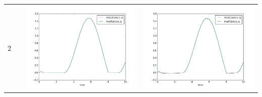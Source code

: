 \documentclass[10pt]{article}
\begin{document}
\begin{table}[htbp]
\begin{tabular}{ccm{6cm}m{6cm}}
    2 && \includegraphics[scale=0.3]{./Figures/DASSL2.png}&\includegraphics[scale=0.3]{./Figures/LIQSS2.png}\\

\end{tabular}
\end{table}
\end{document}
